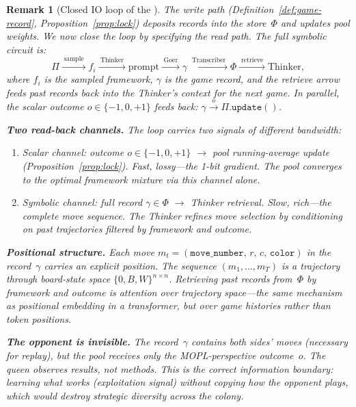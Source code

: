 \documentclass[11pt,a4paper]{article}
\newtheorem{remark}[theorem]{Remark}
\begin{document}
\begin{remark}[Closed IO loop of the
  \begin{CJK}{UTF8}{gbsn}棋谱\end{CJK}]%
\label{rem:io-circuit}
\color{black!60}%
The write path (Definition~\ref{def:game-record},
Proposition~\ref{prop:lock}) deposits records into the
store~$\Phi$ and updates pool weights.
We now close the loop by specifying the \emph{read} path.
The full symbolic circuit is:
\[
  \Pi
  \xrightarrow{\;\text{sample}\;}
  f_i
  \xrightarrow{\;\text{Thinker}\;}
  \text{prompt}
  \xrightarrow{\;\text{Goer}\;}
  \gamma
  \xrightarrow{\;\text{Transcriber}\;}
  \Phi
  \xrightarrow{\;\text{retrieve}\;}
  \text{Thinker},
\]
where $f_i$ is the sampled framework, $\gamma$ is the game
record, and the retrieve arrow feeds past records back
into the Thinker's context for the next game.
In parallel, the scalar outcome
$o \in \{-1,0,+1\}$ feeds back:
$\gamma \xrightarrow{\;o\;} \Pi.\texttt{update}()$.

\medskip\noindent
\textbf{Two read-back channels.}\;
The loop carries two signals of different bandwidth:
\begin{enumerate}
\item \emph{Scalar channel}:
  outcome $o \in \{-1,0,+1\}$
  $\to$ pool running-average update
  (Proposition~\ref{prop:lock}).
  Fast, lossy---the 1-bit gradient.
  The pool converges to the optimal framework mixture
  via this channel alone.
\item \emph{Symbolic channel}:
  full record $\gamma \in \Phi$
  $\to$ Thinker retrieval.
  Slow, rich---the complete move sequence.
  The Thinker refines move selection by conditioning on
  past trajectories filtered by framework and outcome.
\end{enumerate}

\medskip\noindent
\textbf{Positional structure.}\;
Each move $m_t = (\texttt{move\_number},\, r,\, c,\,
\texttt{color})$ in the record~$\gamma$ carries an
explicit position.
The sequence $(m_1, \ldots, m_T)$ is a trajectory through
board-state space $\{0,B,W\}^{n \times n}$.
Retrieving past records from~$\Phi$ by framework and outcome
is \emph{attention over trajectory space}---the same
mechanism as positional embedding in a transformer,
but over game histories rather than token positions.

\medskip\noindent
\textbf{The opponent is invisible.}\;
The record~$\gamma$ contains both sides' moves
(necessary for replay), but the pool receives only the
MOPL-perspective outcome~$o$.
The queen observes \emph{results}, not methods.
This is the correct information boundary:
learning \emph{what works} (exploitation signal)
without copying \emph{how the opponent plays},
which would destroy strategic diversity across the colony.


\end{remark}
\end{document}
